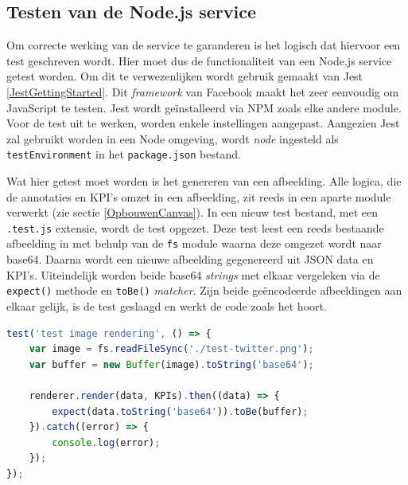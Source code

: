 \subsection{Testen van de Node.js service}
Om correcte werking van de service te garanderen is het logisch dat hiervoor een test geschreven wordt. Hier moet dus de functionaliteit van een Node.js service getest worden. Om dit te verwezenlijken wordt gebruik gemaakt van Jest \ref{JestGettingStarted}. Dit \textit{framework} van Facebook maakt het zeer eenvoudig om JavaScript te testen. Jest wordt ge\"{i}nstalleerd via NPM zoals elke andere module. Voor de test uit te werken, worden enkele instellingen aangepast. Aangezien Jest zal gebruikt worden in een Node omgeving, wordt \textit{node} ingesteld als \texttt{testEnvironment} in het \texttt{package.json} bestand. 

Wat hier getest moet worden is het genereren van een afbeelding. Alle logica, die de annotaties en KPI's omzet in een afbeelding, zit reeds in een aparte module verwerkt (zie sectie \ref{OpbouwenCanvas}). In een nieuw test bestand, met een \texttt{.test.js} extensie, wordt de test opgezet. Deze test leest een reeds bestaande afbeelding in met behulp van de \texttt{fs} module waarna deze omgezet wordt naar base64. Daarna wordt een nieuwe afbeelding gegenereerd uit JSON data en KPI's. Uiteindelijk worden beide base64 \textit{strings} met elkaar vergeleken via de \texttt{expect()} methode en \texttt{toBe()} \textit{matcher}. Zijn beide ge\"{e}ncodeerde afbeeldingen aan elkaar gelijk, is de test geslaagd en werkt de code zoals het hoort. 

\begin{lstlisting}[caption={render.test.js - Testen van de service},label=lst:RenderTest,language=javascript]
test('test image rendering', () => {
	var image = fs.readFileSync('./test-twitter.png');
	var buffer = new Buffer(image).toString('base64');
	
	renderer.render(data, KPIs).then((data) => {
		expect(data.toString('base64')).toBe(buffer);
	}).catch((error) => {
		console.log(error);
	});
});
\end{lstlisting}



